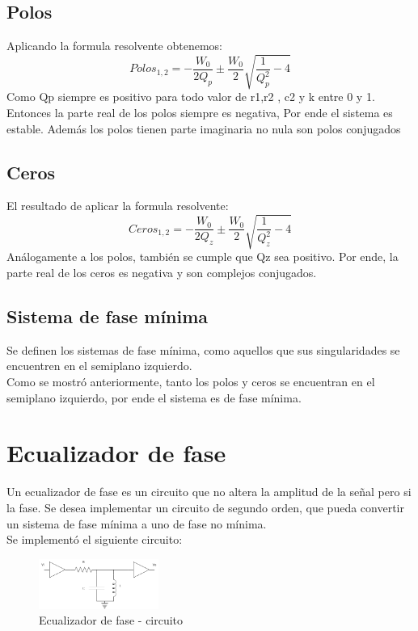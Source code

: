 \documentclass[../../tc_tp3_main.tex]{subfiles}
\begin{document}
\subsection{Polos}
Aplicando la formula resolvente obtenemos:
$$Polos_{1,2}=-\frac{W_0}{2 Q_p} \pm \frac{W_0}{2}\sqrt{\frac{1}{Q_p^2}-4}$$
Como Qp siempre es positivo para todo valor de r1,r2 , c2 y k entre 0 y 1. Entonces la parte real de los polos siempre es negativa, Por ende el sistema es estable. Además los polos  tienen parte imaginaria no nula son polos conjugados
\subsection{Ceros}
El resultado de aplicar la formula resolvente:
$$Ceros_{1,2}=-\frac{W_0}{2 Q_z} \pm \frac{W_0}{2}\sqrt{\frac{1}{Q_z^2}-4}$$
Análogamente a los polos, también se cumple que Qz sea positivo. Por ende, la parte real de los ceros es negativa y son complejos conjugados.

\subsection{Sistema de fase mínima}

Se definen los sistemas de fase mínima, como aquellos que sus singularidades se encuentren en el semiplano izquierdo. 
\\
Como se mostró anteriormente, tanto los polos y ceros se encuentran en el semiplano izquierdo, por ende el sistema es de fase mínima.

\section{Ecualizador de fase}

Un ecualizador de fase es un circuito que no altera la amplitud de la señal pero si la fase.
Se desea implementar un circuito de segundo orden, que pueda convertir un sistema de fase mínima a uno de fase no mínima.
\\
Se implementó el siguiente circuito:
\begin{figure}[H]
\centering
\includegraphics[width=0.35\textwidth]{imagenes/eqFase.png}
\caption{Ecualizador de fase - circuito} 
\end{figure}
\end{document}
